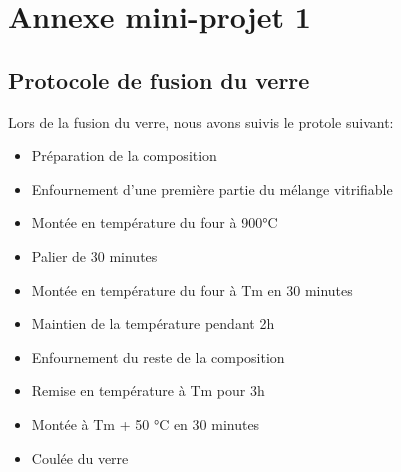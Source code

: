\documentclass{article}
\begin{document}
\section{Annexe mini-projet 1}
\subsection{Protocole de fusion du verre}

Lors de la fusion du verre, nous avons suivis le protole suivant:

\begin{itemize}
    \item Préparation de la composition
    \item Enfournement d'une première partie du mélange vitrifiable
    \item Montée en température du four à 900°C
    \item Palier de 30 minutes
    \item Montée en température du four à Tm en 30 minutes
    \item Maintien de la température pendant 2h
    \item Enfournement du reste de la composition
    \item Remise en température à Tm pour 3h
    \item Montée à Tm + 50 °C en 30 minutes
    \item Coulée du verre
\end{itemize}
\end{document}
